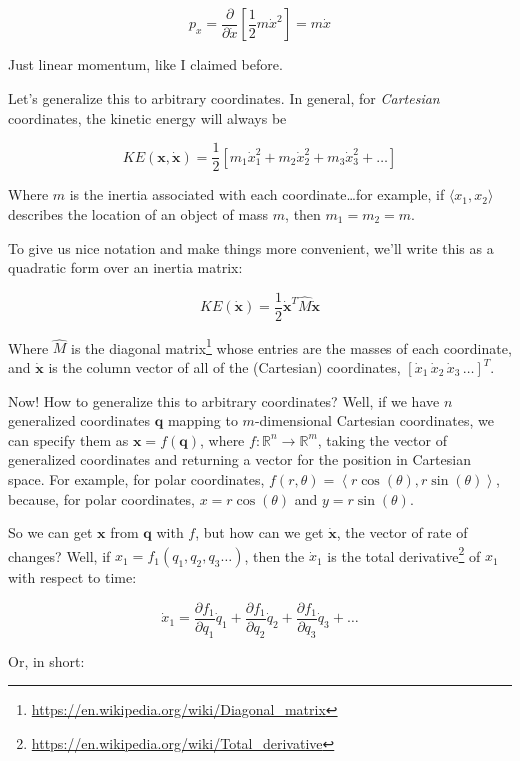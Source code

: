 \documentclass[]{article}
\renewcommand{\href}[2]{#2\footnote{\url{#1}}}
\begin{document}
\[
p_x = \frac{\partial}{\partial \dot{x}} \left[ \frac{1}{2} m \dot{x}^2 \right] = m \dot{x}
\]

Just linear momentum, like I claimed before.

Let's generalize this to arbitrary coordinates. In general, for \emph{Cartesian}
coordinates, the kinetic energy will always be

\[
KE(\mathbf{x}, \dot{\mathbf{x}}) = \frac{1}{2} \left[ m_1 \dot{x}_1^2 + m_2 \dot{x}_2^2 + m_3 \dot{x}_3^2 + \dots \right]
\]

Where \(m\) is the inertia associated with each coordinate\ldots for example, if
\(\langle x_1, x_2 \rangle\) describes the location of an object of mass \(m\),
then \(m_1 = m_2 = m\).

To give us nice notation and make things more convenient, we'll write this as a
quadratic form over an inertia matrix:

\[
KE(\dot{\mathbf{x}}) = \frac{1}{2} \dot{\mathbf{x}}^T \hat{M} \dot{\mathbf{x}}
\]

Where \(\hat{M}\) is the
\href{https://en.wikipedia.org/wiki/Diagonal_matrix}{diagonal matrix} whose
entries are the masses of each coordinate, and \(\dot{\mathbf{x}}\) is the
column vector of all of the (Cartesian) coordinates,
\(\left[ \dot{x}_1\, \dot{x}_2\, \dot{x}_3\, \dots \right]^T\).

Now! How to generalize this to arbitrary coordinates? Well, if we have \(n\)
generalized coordinates \(\mathbf{q}\) mapping to \(m\)-dimensional Cartesian
coordinates, we can specify them as \(\mathbf{x} = f(\mathbf{q})\), where \(f :
\mathbb{R}^n \rightarrow \mathbb{R}^m\), taking the vector of generalized
coordinates and returning a vector for the position in Cartesian space. For
example, for polar coordinates, \(f(r, \theta) = \left \langle r \cos(\theta), r
\sin(\theta) \right \rangle\), because, for polar coordinates, \(x = r
\cos(\theta)\) and \(y = r \sin(\theta)\).

So we can get \(\mathbf{x}\) from \(\mathbf{q}\) with \(f\), but how can we get
\(\dot{\mathbf{x}}\), the vector of rate of changes? Well, if \(x_1 = f_1(q_1,
q_2, q_3 \dots)\), then the \(\dot{x}_1\) is the
\href{https://en.wikipedia.org/wiki/Total_derivative}{total derivative} of
\(x_1\) with respect to time:

\[
\dot{x}_1 = \frac{\partial f_1}{\partial q_1} \dot{q}_1 +
    \frac{\partial f_1}{\partial q_2} \dot{q}_2 +
    \frac{\partial f_1}{\partial q_3} \dot{q}_3 + \dots
\]

Or, in short:
\end{document}

